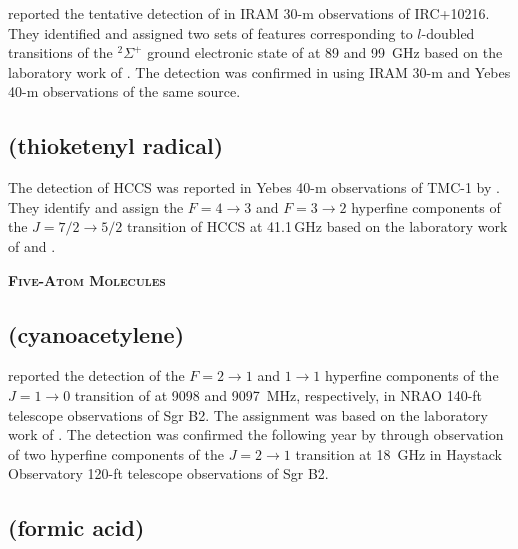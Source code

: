 \documentclass[twocolumn]{aastex631}
\newcommand{\update}[1]{{#1}}
\begin{document}
   	\citet{Agundez:2014gm} reported the tentative detection of  in IRAM 30-m observations of IRC+10216.  They identified and assigned two sets of features corresponding to $l$-doubled transitions of the $^2\Sigma ^+$ ground electronic state of  at 89 and 99~GHz based on the laboratory work of \citet{Brewster:1999kr}. \update{The detection was confirmed in \citet{Cernicharo:2019ga} using IRAM 30-m and Yebes 40-m observations of the same source.}
	
	\subsection{\update{ (thioketenyl radical)}}
    	\label{HCCS}
    
   	\update{The detection of HCCS was reported in Yebes 40-m observations of TMC-1 by \citet{Cernicharo:2021ke}.  They identify and assign the $F = 4 \rightarrow 3$ and $F = 3 \rightarrow 2$ hyperfine components of the $J = 7/2\rightarrow5/2$ transition of HCCS at 41.1\,GHz based on the laboratory work of \citet{2002JMoSp.212...83K} and \citet{Vrtilek:1992jt}.}
	
		
    
    \begin{center}
        \large
        \textsc{\textbf{Five-Atom Molecules}}
        \label{5atoms}
        \normalsize
    \end{center}        

	\subsection{ (cyanoacetylene)}
	\label{HC3N}
	
	\citet{Turner:1971kj} reported the detection of the $F = 2\rightarrow1$ and $1\rightarrow1$ hyperfine components of the $J = 1\rightarrow0$ transition of  at 9098 and 9097~MHz, respectively, in NRAO 140-ft telescope observations of Sgr B2.  The assignment was based on the laboratory work of \citet{Tyler:1963hu}.  The detection was confirmed the following year by \citet{Dickinson:1972rt} through observation of two hyperfine components of the $J = 2\rightarrow1$ transition at 18~GHz in Haystack Observatory 120-ft telescope observations of Sgr B2.
	
	\subsection{ (formic acid)}
	\label{HCOOH}
	
\end{document}
